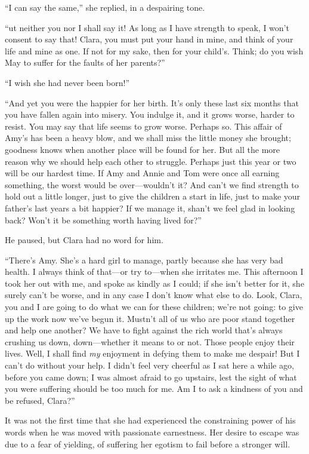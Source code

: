 ``I can say the same,'' she replied, in a despairing tone.

``ut neither you nor I shall say it! As long as I have strength to
speak, I won't consent to say that! Clara, you must put your hand in
mine, and think of your life and mine as one. If not for my sake, then
for your child's. Think; do you wish May to suffer for the faults of her
parents?''

``I wish she had never been born!''

``And yet you were the happier for her birth. It's only these last six
months that you have fallen again into misery. You indulge it, and it
grows worse, harder to resist. You may say that life seems to grow
worse. Perhaps so. This affair of Amy's has been a heavy blow, and we
shall miss the little money she brought; goodness knows when another
place will be found for her. But all the more
{\protect\hypertarget{282}{}{}}reason why we should help each other to
struggle. Perhaps just this year or two will be our hardest time. If Amy
and Annie and Tom were once all earning something, the worst would be
over---wouldn't it? And can't we find strength to hold out a little
longer, just to give the children a start in life, just to make your
father's last years a bit happier? If we manage it, shan't we feel glad
in looking back? Won't it be something worth having lived for?''

He paused, but Clara had no word for him.

``There's Amy. She's a hard girl to manage, partly because she has very
bad health. I always think of that---or try to---when she irritates me.
This afternoon I took her out with me, and spoke as kindly as I could;
if she isn't better for it, she surely can't be worse, and in any case I
don't know what else to do. Look, Clara, you and I are going to do what
we can for these children; we're not going: to give up the work now
we've begun it. Mustn't all of us who are poor stand together and help
one another? We have to fight against the rich world that's always
crushing us down, down---whether it means to or not. Those people enjoy
their lives. Well, I shall find {\protect\hypertarget{283}{}{}}\emph{my}
enjoyment in defying them to make me despair! But I can't do without
your help. I didn't feel very cheerful as I sat here a while ago, before
you came down; I was almost afraid to go upstairs, lest the sight of
what you were suffering should be too much for me. Am I to ask a
kindness of you and be refused, Clara?''

It was not the first time that she had experienced the constraining
power of his words when he was moved with passionate earnestness. Her
desire to escape was due to a fear of yielding, of suffering her egotism
to fail before a stronger will.

